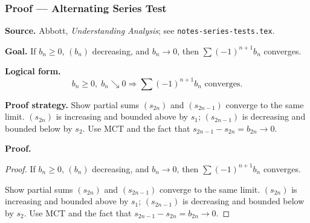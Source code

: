 
\clearpage
{}
\hypertarget{proof-RA-ABB-T-alternating-series}{}

\subsubsection[Alternating Series Test]{Proof --- Alternating Series Test}

\bigskip

\noindent
\textbf{Source.}
Abbott, \emph{Understanding Analysis}; see \texttt{notes-series-tests.tex}.

\vspace{0.75em}

\noindent
\textbf{Goal.}
If $b_n \ge 0$, $(b_n)$ decreasing, and $b_n \to 0$, then $\sum (-1)^{n+1} b_n$ converges.

\vspace{0.75em}

\noindent
\textbf{Logical form.}
\[
  b_n \ge 0,\; b_n \searrow 0 \Rightarrow \sum (-1)^{n+1} b_n \text{ converges}.
\]

\vspace{0.75em}

\noindent
\textbf{Proof strategy.}
Show partial sums $(s_{2n})$ and $(s_{2n-1})$ converge to the same limit. $(s_{2n})$ is increasing and bounded above by $s_1$; $(s_{2n-1})$ is decreasing and bounded below by $s_2$. Use MCT and the fact that $s_{2n-1} - s_{2n} = b_{2n} \to 0$.

\vspace{0.75em}

\noindent
\textbf{Proof.}
\begin{proof}
\Claim If $b_n \ge 0$, $(b_n)$ decreasing, and $b_n \to 0$, then $\sum (-1)^{n+1} b_n$ converges.

\Given 

\Goal 

\Strategy Show partial sums $(s_{2n})$ and $(s_{2n-1})$ converge to the same limit. $(s_{2n})$ is increasing and bounded above by $s_1$; $(s_{2n-1})$ is decreasing and bounded below by $s_2$. Use MCT and the fact that $s_{2n-1} - s_{2n} = b_{2n} \to 0$.

\medskip


\end{proof}

